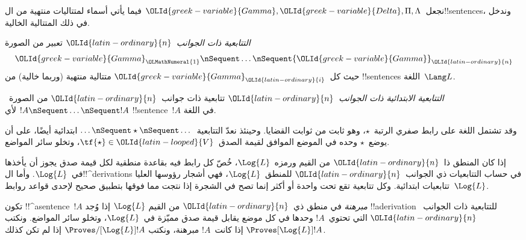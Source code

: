 \documentclass[../../../include/open-logic-section]{subfiles}
\begin{document}


نجعل~${\OLId{greek-variable}{Gamma}}, {\OLId{greek-variable}{Delta}}, \Pi, \Lambda$ فيما يأتي أسماء لمتتاليات
منتهية من ال!!{sentence}s، وندخل في ذلك المتتالية الخالية.

\begin{defn}[التتابعية]
\emph{التتابعية ذات الجوانب~${\OLId{latin-ordinary}{n}}$} تعبير من الصورة
\[
{\OLId{greek-variable}{Gamma}}_{\OLMathNumeral{1}} \nSequent \dots \nSequent {\OLId{greek-variable}{Gamma}}_{\OLId{latin-ordinary}{n}}
\]
حيث كل~${\OLId{greek-variable}{Gamma}}_{\OLId{latin-ordinary}{i}}$ متتالية منتهية (وربما خالية) من !!{sentence}s
اللغة~$\Lang L$.
\end{defn}

\begin{defn}
\emph{التتابعية الابتدائية ذات الجوانب~${\OLId{latin-ordinary}{n}}$} تتابعية ذات جوانب~${\OLId{latin-ordinary}{n}}$ من
الصورة~$!A \nSequent \dots \nSequent !A$ لأي !!{sentence}~$!A$ في
اللغة.

وقد تشتمل اللغة على رابط صفري الرتبة~$\star$، وهو ثابت من ثوابت
القضايا. وحينئذ نعدّ التتابعية~$\dots \nSequent \star \nSequent \dots$
ابتدائية أيضًا، على أن يوضع~$\star$ وحده في الموضع الموافق لقيمة
الصدق~$\tf{\star} \in {\OLId{latin-looped}{V}}$، وتخلو سائر المواضع.
\end{defn}

إذا كان المنطق ذا~${\OLId{latin-ordinary}{n}}$ من القيم ورمزه~$\Log{L}$، خُصّ كل رابط فيه
بقاعدة منطقية لكل قيمة صدق يجوز أن يأخذها في~$\Log{L}$.
وأما ال!!^{derivation}s في حساب التتابعيات ذي الجوانب~${\OLId{latin-ordinary}{n}}$ للمنطق~$\Log{L}$،
فهي أشجار رؤوسها العليا تتابعيات ابتدائية. وكل تتابعية تقع تحت واحدة
أو أكثر إنما تصح في الشجرة إذا نتجت مما فوقها بتطبيق صحيح لإحدى
قواعد روابط~$\Log{L}$.

\begin{defn}[المبرهنات]
تكون !!^a{sentence}~$!A$ \emph{مبرهنة} في منطق ذي~${\OLId{latin-ordinary}{n}}$ من القيم
$\Log{L}$ إذا وُجد !!a{derivation} للتتابعية ذات الجوانب~${\OLId{latin-ordinary}{n}}$ التي
تحتوي~$!A$ وحدها في كل موضع يقابل قيمة صدق مميّزة في~$\Log{L}$،
وتخلو سائر المواضع. ونكتب
$\Proves[\Log{L}] !A$ إذا كانت~$!A$ مبرهنة، ونكتب
$\Proves/[\Log{L}] !A$ إذا لم تكن كذلك.
\end{defn}
\end{document}
